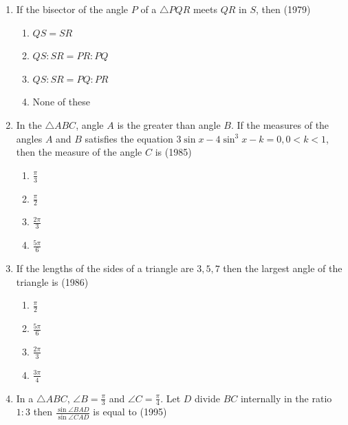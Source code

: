 \begin{enumerate}[label=\thesubsection.\arabic*,ref=\thesubsection.\theenumi]
\begin{multicols}{4}
\begin{enumerate}
    	\end{enumerate}
    \end{multicols}
    \item If the bisector of the angle $P$ of a $\triangle PQR$ meets $QR$ in $S$, then \hfill (1979)
\begin{multicols}{2}
    \begin{enumerate}
        \item $QS = SR$
        \item $QS : SR = PR : PQ$
        \item $QS : SR = PQ : PR$
        \item None of these \hfill 
    \end{enumerate}
\end{multicols}
    \item In the $\triangle ABC$, angle $A$ is the greater than angle $B$. If the measures of the angles $A$ and $B$ satisfies the equation $3\sin x - 4 \sin^3 x - k = 0, 0<k<1$, then the measure of the angle $C$ is 
		\hfill (1985)
	    \begin{multicols}{4}
	    \begin{enumerate}
     \item $\frac{\pi}{3}$
     \item $\frac{\pi}{2}$
     \item $\frac{2\pi}{3}$
     \item $\frac{5\pi}{6}$ 
\end{enumerate}
	    \end{multicols}
    \item If the lengths of the sides of a triangle are $3,5,7$ then the largest angle of the triangle is
		\hfill (1986)
	    \begin{multicols}{4}
	    \begin{enumerate}
     \item $\frac{\pi}{2}$
     \item $\frac{5\pi}{6}$
     \item $\frac{2\pi}{3}$
     \item $\frac{3\pi}{4}$ 
	    \end{enumerate}
	    \end{multicols}
\item In a $\triangle ABC$, $\angle B = \frac{\pi}{3}$ and $\angle C = \frac{\pi}{4}$. Let ${D}$ divide $BC$ internally in the ratio $1\colon3$ then $\frac{\sin\angle BAD}{\sin \angle CAD}$ is equal to
\hfill (1995)
	    \begin{multicols}{4}
\begin{enumerate}

\end{enumerate}
\end{multicols}
\end{enumerate}
